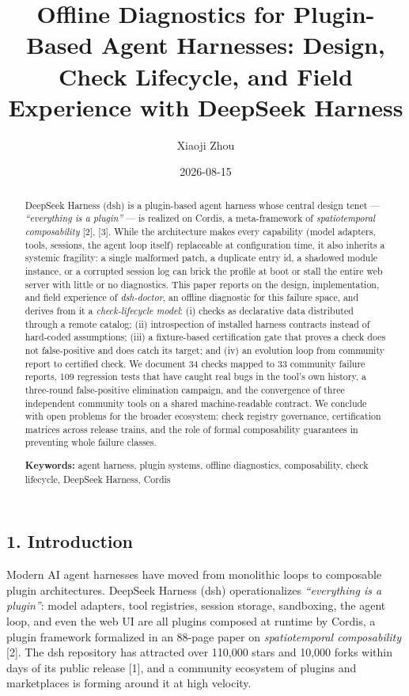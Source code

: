 \documentclass[
]{article}
\title{Offline Diagnostics for Plugin-Based Agent Harnesses: Design,
Check Lifecycle, and Field Experience with DeepSeek Harness}
\author{Xiaoji Zhou}
\date{2026-08-15}
\begin{document}
\maketitle

\begin{abstract}
DeepSeek Harness (dsh) is a plugin-based agent harness whose central
design tenet --- \emph{``everything is a plugin''} --- is realized on
Cordis, a meta-framework of \emph{spatiotemporal composability} {[}2{]},
{[}3{]}. While the architecture makes every capability (model adapters,
tools, sessions, the agent loop itself) replaceable at configuration
time, it also inherits a systemic fragility: a single malformed patch, a
duplicate entry id, a shadowed module instance, or a corrupted session
log can brick the profile at boot or stall the entire web server with
little or no diagnostics. This paper reports on the design,
implementation, and field experience of \emph{dsh-doctor}, an offline
diagnostic for this failure space, and derives from it a
\emph{check-lifecycle model}: (i) checks as declarative data distributed
through a remote catalog; (ii) introspection of installed harness
contracts instead of hard-coded assumptions; (iii) a fixture-based
certification gate that proves a check does not false-positive and does
catch its target; and (iv) an evolution loop from community report to
certified check. We document 34 checks mapped to 33 community failure
reports, 109 regression tests that have caught real bugs in the tool's
own history, a three-round false-positive elimination campaign, and the
convergence of three independent community tools on a shared
machine-readable contract. We conclude with open problems for the
broader ecosystem: check registry governance, certification matrices
across release trains, and the role of formal composability guarantees
in preventing whole failure classes.

\textbf{Keywords:} agent harness, plugin systems, offline diagnostics,
composability, check lifecycle, DeepSeek Harness, Cordis
\end{abstract}

\subsection{1. Introduction}\label{introduction}

Modern AI agent harnesses have moved from monolithic loops to composable
plugin architectures. DeepSeek Harness (dsh) operationalizes
\emph{``everything is a plugin''}: model adapters, tool registries,
session storage, sandboxing, the agent loop, and even the web UI are all
plugins composed at runtime by Cordis, a plugin framework formalized in
an 88-page paper on \emph{spatiotemporal composability} {[}2{]}. The dsh
repository has attracted over 110,000 stars and 10,000 forks within days
of its public release {[}1{]}, and a community ecosystem of plugins and
marketplaces is forming around it at high velocity.
\end{document}

